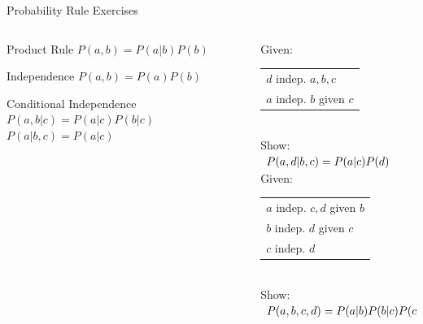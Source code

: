 \documentclass[12pt]{beamer}
\begin{document}
\begin{frame}{Probability Rule Exercises}
	\begin{columns}
		\begin{column}{2in}
			\begin{block}{Product Rule}
				$P(a,b) = P(a|b)P(b)$
			\end{block}
			\begin{block}{Independence}
				$P(a,b) = P(a)P(b)$
			\end{block}
			\begin{block}{Conditional Independence}
				$P(a,b|c) = P(a|c)P(b|c)$ \\
				$P(a|b,c) = P(a|c)$ \\
			\end{block}
		\end{column}
		\begin{column}{2.4in}
			\small
			Given: \\
			\begin{tabular}[t]{l}
				$d$ indep. $a,b,c$ \\
				$a$ indep. $b$ given $c$
			\end{tabular}
			\\ \smallskip
			Show:
			\\ \smallskip
			$
			\begin{array}{l@{}}
				P(a,d|b,c) = P(a|c)P(d)
			\end{array}
			$
			\\ \bigskip
			Given: \\
			\begin{tabular}[t]{l}
				$a$ indep. $c,d$ given $b$ \\
				$b$ indep. $d$ given $c$ \\
				$c$ indep. $d$
			\end{tabular}
			\\ \smallskip
			Show:
			\\ \smallskip
			\footnotesize
			$
			\begin{array}{l@{}}
				P(a,b,c,d) = P(a|b)P(b|c)P(c)P(d)
			\end{array}
			$
		\end{column}
	\end{columns}
\end{frame}
\end{document}
